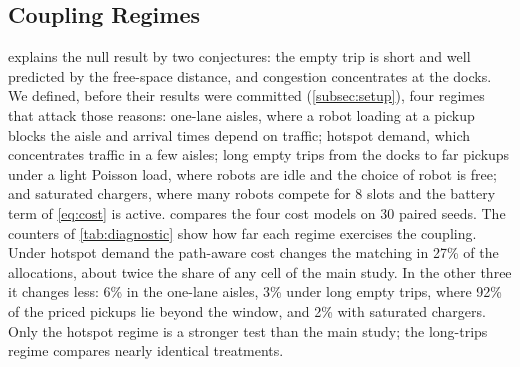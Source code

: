 \subsection{Coupling Regimes}\label{subsec:coupling}


 explains the null result by two conjectures: the empty trip
is short and well predicted by the free-space distance, and congestion
concentrates at the docks. We defined, before their results were committed (\cref{subsec:setup}), four regimes that attack
those reasons: one-lane aisles, where a robot loading at
a pickup blocks the aisle and arrival times depend on traffic; hotspot
demand, which concentrates traffic in a few aisles; long empty trips from
the docks to far pickups under a light Poisson load, where robots are idle
and the choice of robot is free; and saturated chargers, where many robots
compete for 8 slots and the battery term of \cref{eq:cost} is active.
 compares the four cost models on 30 paired seeds.
The counters of \cref{tab:diagnostic} show how far each regime exercises
the coupling. Under hotspot demand the path-aware cost changes the matching
in 27\% of the allocations, about twice the share of any cell of the main
study. In the other three it changes less: 6\% in the one-lane aisles, 3\%
under long empty trips, where 92\% of the priced pickups lie beyond the
window, and 2\% with saturated chargers. Only the hotspot regime is a
stronger test than the main study; the long-trips regime compares nearly
identical treatments.

